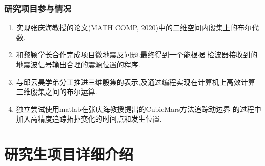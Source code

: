 \documentclass[UTF8]{ctexbeamer}	%
\theoremstyle{plain}
\theoremstyle{definition}
\theoremstyle{remark}
\numberwithin{equation}{section}
\begin{document}
\begin{frame}[fragile]
   \frametitle{研究项目参与情况}
    \small{\begin{enumerate}
        \item 实现张庆海教授的论文(MATH COMP, 2020)中的二维空间内殷集上的布尔代数.
        \item 和黎颖学长合作完成项目微地震反问题.最终得到一个能根据
        检波器接收到的地震波信号输出合理的震源位置的程序.
        \item 与邱云昊学弟分工推进三维殷集的表示,及通过编程实现在计算机上高效计算
        三维殷集之间的布尔运算.
        \item 独立尝试使用matlab在张庆海教授提出的CubicMars方法追踪动边界
        的过程中加入高精度追踪拓扑变化的时间点和发生位置.
    \end{enumerate}}
\end{frame}

\section{研究生项目详细介绍}

\end{document}
